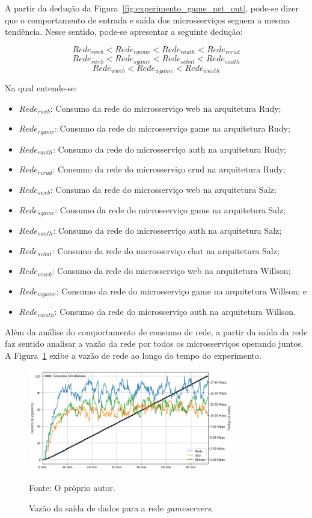 A partir da dedução da Figura~\ref{fig:experimento_game_net_out}, pode-se dizer que o comportamento de entrada e saída dos microsserviços seguem a mesma tendência.
%
Nesse sentido, pode-se apresentar a seguinte dedução:

$$
     Rede_{rweb} < Rede_{rgame} < Rede_{rauth} < Rede_{rcrud}
$$
$$
     Rede_{sweb} < Rede_{sgame} < Rede_{schat} < Rede_{sauth}
$$
$$
     Rede_{wweb} < Rede_{wgame} < Rede_{wauth}
$$

Na qual entende-se:

\begin{itemize}
 \item $Rede_{rweb}$: Consumo da rede do microsserviço web na arquitetura Rudy;
 \item $Rede_{rgame}$: Consumo da rede do microsserviço game na arquitetura Rudy;
 \item $Rede_{rauth}$: Consumo da rede do microsserviço auth na arquitetura Rudy;
 \item $Rede_{rcrud}$: Consumo da rede do microsserviço crud na arquitetura Rudy;
  \item $Rede_{sweb}$: Consumo da rede do microsserviço web na arquitetura Salz;
 \item $Rede_{sgame}$: Consumo da rede do microsserviço game na arquitetura Salz;
 \item $Rede_{sauth}$: Consumo da rede do microsserviço auth na arquitetura Salz;
 \item $Rede_{schat}$: Consumo da rede do microsserviço chat na arquitetura Salz;
 \item $Rede_{wweb}$: Consumo da rede do microsserviço web na arquitetura Willson;
 \item $Rede_{wgame}$: Consumo da rede do microsserviço game na arquitetura Willson; e
 \item $Rede_{wauth}$: Consumo da rede do microsserviço auth na arquitetura Willson.
\end{itemize}

Além da análise do comportamento de consumo de rede, a partir da saída da rede faz sentido analisar a vazão da rede por todos os microsserviços operando juntos.
%
A Figura~\ref{fig:net_in_gs} exibe a vazão de rede ao longo do tempo do experimento.

\begin{figure}[htb!]
  \caption{Vazão da saída de dados para a rede \textit{gameservers}.}
  \label{fig:net_in_gs}
  \includegraphics[width=0.8\textwidth]{figuras/analise/net_in_gs.png}
  \centering

  Fonte: O próprio autor.
\end{figure}

